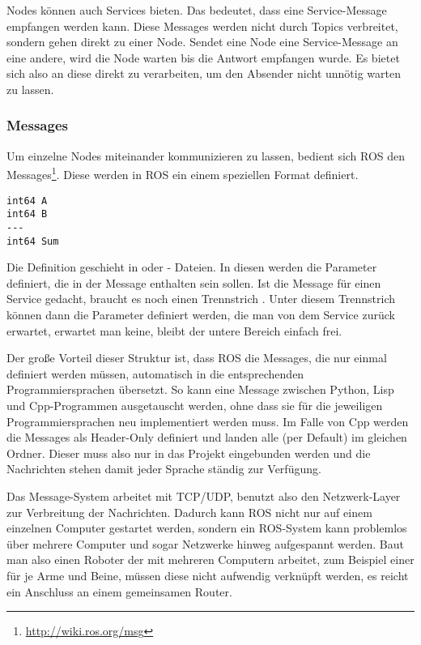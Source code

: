 Nodes können auch Services bieten. Das bedeutet, dass eine Service-Message empfangen werden kann. Diese Messages werden nicht durch Topics verbreitet, sondern gehen direkt zu einer Node. Sendet eine Node eine Service-Message an eine andere, wird die Node warten bis die Antwort empfangen wurde. Es bietet sich also an diese direkt zu verarbeiten, um den Absender nicht unnötig warten zu lassen.

\subsubsection*{Messages}
Um einzelne Nodes miteinander kommunizieren zu lassen, bedient sich ROS den Messages\footnote{\url{http://wiki.ros.org/msg}}. Diese werden in ROS ein einem speziellen Format definiert.

\begin{lstlisting}[style=rosm, title=Message für einen Service der 2 Zahlen addiert und das Ergebnis zurück gibt]
int64 A
int64 B
---
int64 Sum
\end{lstlisting}

Die Definition geschieht in  oder  - Dateien. In diesen werden die Parameter definiert, die in der Message enthalten sein sollen. Ist die Message für einen Service gedacht, braucht es noch einen Trennstrich \highlight{---}. Unter diesem Trennstrich können dann die Parameter definiert werden, die man von dem Service zurück erwartet, erwartet man keine, bleibt der untere Bereich einfach frei.

Der große Vorteil dieser Struktur ist, dass ROS die Messages, die nur einmal definiert werden müssen, automatisch in die entsprechenden Programmiersprachen übersetzt. So kann eine Message zwischen Python, Lisp und Cpp-Programmen ausgetauscht werden, ohne dass sie für die jeweiligen Programmiersprachen neu implementiert werden muss. Im Falle von Cpp werden die Messages als Header-Only definiert und landen alle (per Default) im gleichen Ordner. Dieser muss also nur in das Projekt eingebunden werden und die Nachrichten stehen damit jeder Sprache ständig zur Verfügung.

Das Message-System arbeitet mit TCP/UDP, benutzt also den Netzwerk-Layer zur Verbreitung der Nachrichten. Dadurch kann ROS nicht nur auf einem einzelnen Computer gestartet werden, sondern ein ROS-System kann problemlos über mehrere Computer und sogar Netzwerke hinweg aufgespannt werden. Baut man also einen Roboter der mit mehreren Computern arbeitet, zum Beispiel einer für je Arme und Beine, müssen diese nicht aufwendig verknüpft werden, es reicht ein Anschluss an einem gemeinsamen Router.


